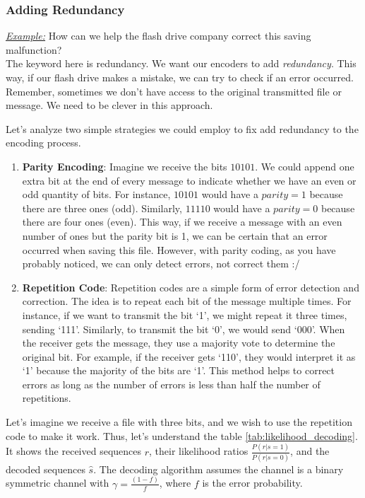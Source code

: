 \documentclass[a4paper,10pt]{article}
\newcommand{\hlt}[1]{\colorbox{color3}{#1}}
\newcommand{\hlti}[1]{\colorbox{color1}{#1}}
\begin{document}
\subsubsection{Adding Redundancy}

\noindent \underline{\textit{Example:}} How can we help the flash drive company correct this saving malfunction?\\

The keyword here is \hlti{redundancy}. We want our encoders to add \textit{redundancy}. This way, if our flash drive makes a mistake, we can try to check if an error occurred. Remember, sometimes we don't have access to the original transmitted file or message. We need to be clever in this approach.

Let's analyze two simple strategies we could employ to fix add redundancy to the encoding process. 

\begin{enumerate}
    \item \hlti{\textbf{Parity Encoding}}: Imagine we receive the bits $10101$. We could append one extra bit at the end of every message to indicate whether we have an even or odd quantity of bits. For instance, $10101$ would have a $parity = 1$ because there are three ones (odd). Similarly, $11110$ would have a $parity = 0$ because there are four ones (even). This way, if we receive a message with an even number of ones but the parity bit is 1, we can be certain that an error occurred when saving this file. However, with parity coding, as you have probably noticed, we can only detect errors, not correct them :/

    \item \hlti{\textbf{Repetition Code}}: Repetition codes are a simple form of error detection and correction. The idea is to repeat each bit of the message multiple times. For instance, if we want to transmit the bit `1', we might repeat it three times, sending `111'. Similarly, to transmit the bit `0', we would send `000'. When the receiver gets the message, they use a \hlt{majority vote} to determine the original bit. For example, if the receiver gets `110', they would interpret it as `1' because the majority of the bits are `1'. This method helps to correct errors as long as the number of errors is less than half the number of repetitions.
\end{enumerate}

Let's imagine we receive a file with three bits, and we wish to use the repetition code to make it work. Thus, let's understand the table \ref{tab:likelihood_decoding}. It shows the received sequences $r$, their likelihood ratios $\frac{P(r|s=1)}{P(r|s=0)}$, and the decoded sequences $\hat{s}$. The decoding algorithm assumes the channel is a binary symmetric channel with $\gamma = \frac{(1 - f)}{f}$, where $f$ is the error probability.
\end{document}
